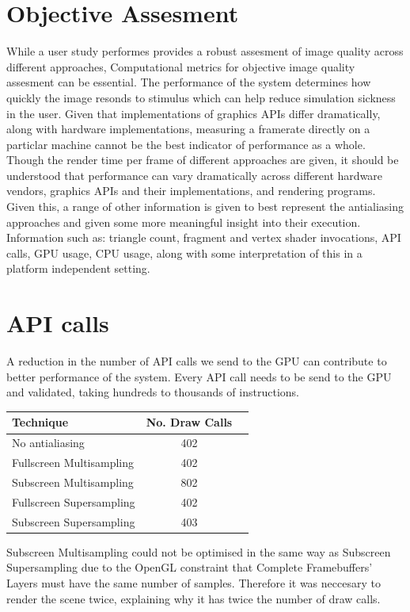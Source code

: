 \documentclass[12pt,a4paper,twoside,openright]{report}
\begin{document}
\section{Objective Assesment}

While a user study performes provides a robust assesment of image quality across different approaches, Computational metrics for objective image quality assesment can be essential. The performance of the system determines how quickly the image resonds to stimulus which can help reduce simulation sickness in the user. Given that implementations of graphics APIs differ dramatically, along with hardware implementations, measuring a framerate directly on a particlar machine cannot be the best indicator of performance as a whole. Though the render time per frame of different approaches are given, it should be understood that performance can vary dramatically across different hardware vendors, graphics APIs and their implementations, and rendering programs. Given this, a range of other information is given to best represent the antialiasing approaches and given some more meaningful insight into their execution. Information such as: triangle count, fragment and vertex shader invocations, API calls, GPU usage, CPU usage, along with some interpretation of this in a platform independent setting.

\section{API calls}

A reduction in the number of API calls we send to the GPU can contribute to better performance of the system. Every API call needs to be send to the GPU and validated, taking hundreds to thousands of instructions.

\begin{center}
\begin{tabular}{l|c|r}
Technique   & No. Draw Calls \\ 
\hline
No antialiasing      & 402 \\
Fullscreen Multisampling     & 402 \\
Subscreen Multisampling    &  802  \\
Fullscreen Supersampling      &  402   \\
Subscreen Supersampling    &  403  \\
\end{tabular}
\end{center}

Subscreen Multisampling could not be optimised in the same way as Subscreen Supersampling due to the OpenGL constraint that Complete Framebuffers' Layers must have the same number of samples. Therefore it was neccesary to render the scene twice, explaining why it has twice the number of draw calls.
\end{document}
